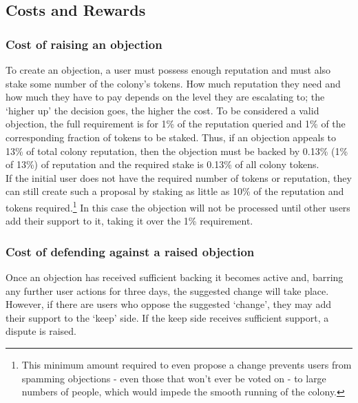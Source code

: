 
\subsection{Costs and Rewards}\label{sec:costs-of-disputes}
\subsubsection{Cost of raising an objection}
To create an objection, a user must possess enough reputation and must also stake some number of the colony's tokens. How much reputation they need and how much they have to pay depends on the level they are escalating to; the `higher up' the decision goes, the higher the cost. To be considered a valid objection, the full requirement is for 1\% of the reputation queried and 1\% of the corresponding fraction of tokens to be staked. Thus, if an objection appeals to 13\% of total colony reputation, then the objection must be backed by 0.13\% (1\% of 13\%) of reputation and the required stake is 0.13\% of all colony tokens.\\
If the initial user does not have the required number of tokens or reputation, they can still create such a proposal by staking as little as 10\% of the reputation and tokens required.\footnote{This minimum amount required to even propose a change prevents users from spamming objections - even those that won’t ever be voted on - to large numbers of people, which would impede the smooth running of the colony.} In this case the objection will not be processed until other users add their support to it, taking it over the 1\% requirement. 

\subsubsection{Cost of defending against a raised objection}
Once an objection has received sufficient backing it becomes active and, barring any further user actions for three days, the suggested change will take place. 
However, if there are users who oppose the suggested `change', they may add their support to the `keep' side. If the keep side receives sufficient support, a dispute is raised. 

